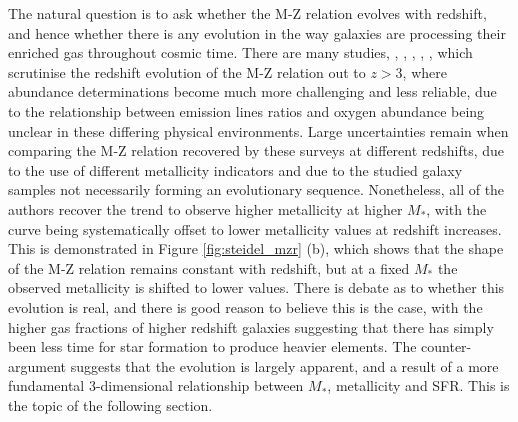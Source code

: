 \documentclass{literature}
\begin{document}
The natural question is to ask whether the M-Z relation evolves with redshift, and hence whether there is any evolution in the way galaxies are processing their enriched gas throughout cosmic time. There are many studies, \citep{Savaglio2005}, \citep{Erb_2006}, \citep{Maiolino2008}, \citep{Henry2013}, \citep{Wuyts_2014}, \citep{Steidel2014} which scrutinise the redshift evolution of the M-Z relation out to $z > 3$, where abundance determinations become much more challenging and less reliable, due to the relationship between emission lines ratios and oxygen abundance being unclear in these differing physical environments. Large uncertainties remain when comparing the M-Z relation recovered by these surveys at different redshifts, due to the use of different metallicity indicators and due to the studied galaxy samples not necessarily forming an evolutionary sequence. Nonetheless, all of the authors recover the trend to observe higher metallicity at higher $M_{*}$, with the curve being systematically offset to lower metallicity values at redshift increases. This is demonstrated in Figure \ref{fig:steidel_mzr} (b), which shows that the shape of the M-Z relation remains constant with redshift, but at a fixed $M_{*}$ the observed metallicity is shifted to lower values. There is debate as to whether this evolution is real, and there is good reason to believe this is the case, with the higher gas fractions of higher redshift galaxies suggesting that there has simply been less time for star formation to produce heavier elements. The counter-argument suggests that the evolution is largely apparent, and a result of a more fundamental 3-dimensional relationship between $M_{*}$, metallicity and SFR. This is the topic of the following section.
\end{document}
